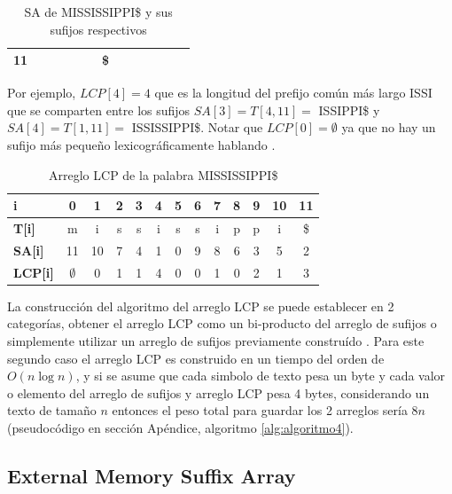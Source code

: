\begin{table}[!htb]
\begin{tabular}{|l|l|l|l|l|l|l|l|l|l|l|l|l|}
\textbf{11}                                                      &                         &                         &                        &                        &                        & \$                      &                        &                        &                        &                        &                         &                         \\ \hline
\end{tabular}
\caption{SA de MISSISSIPPI\$ y sus sufijos respectivos}
\end{table}

Por ejemplo, $LCP[4] = 4$ que es la longitud del prefijo común más largo ISSI que se comparten entre los sufijos $SA[3] = T[4,11] =$ ISSIPPI\$ y $SA[4] = T[1,11] =$ ISSISSIPPI\$. Notar que $LCP[0] = \emptyset$ ya que no hay un sufijo más pequeño lexicográficamente hablando \cite{lcparray}.

\begin{table}[!htb]
\centering
\label{my-label11}
\begin{tabular}{|l|c|c|c|c|c|c|c|c|c|c|c|c|}
\hline
\textbf{i}         & 0  & 1  & 2 & 3 & 4 & 5 & 6 & 7 & 8 & 9 & 10 & 11 \\ \hline
\textbf{T{[}i{]}}  & m  & i  & s & s & i & s & s & i & p & p & i  & \$  \\ \hline
\textbf{SA{[}i{]}} & 11 & 10 & 7 & 4 & 1 & 0 & 9 & 8 & 6 & 3 & 5  & 2  \\ \hline
\textbf{LCP{[}i{]}} & $\emptyset$  & 0  & 1 & 1 & 4 & 0 & 0 & 1 & 0 & 2 & 1  & 3  \\ \hline
\end{tabular}
\caption{Arreglo LCP de la palabra MISSISSIPPI\$}
\end{table}

La construcción del algoritmo del arreglo LCP se puede establecer en 2 categorías, obtener el arreglo LCP como un bi-producto del arreglo de sufijos \cite{suffixarray1} o simplemente utilizar un arreglo de sufijos previamente construído \cite{kasai}. Para este segundo caso el arreglo LCP es construido en un tiempo del orden de $O(n \log n)$, y si se asume que cada simbolo de texto pesa un byte y cada valor o elemento del arreglo de sufijos y arreglo LCP pesa 4 bytes, considerando un texto de tamaño $n$ entonces el peso total para guardar los 2 arreglos sería $8n$ (pseudocódigo en sección Apéndice, algoritmo \ref{alg:algoritmo4}).


\subsection{External Memory Suffix Array}

